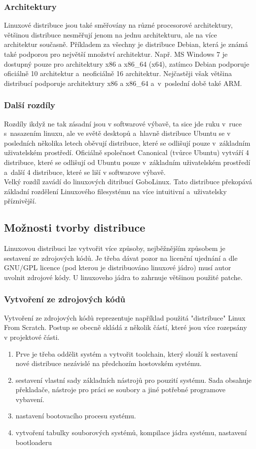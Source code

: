 \documentclass[a4paper,12pt]{article}
\begin{document}
\subsubsection{Architektury}
Linuxové distribuce jsou také směřovány na různé procesorové architektury, většinou distribuce nesměřují jenom na jednu architekturu, ale na více architektur současně. Příkladem za všechny je distribuce Debian, která je známá také podporou pro největší množství architektur. Např. MS Windows 7 je dostupný pouze pro architektury x86 a x86\_64 (x64), zatímco Debian podporuje oficiálně 10 architektur a~neoficiálně 16 architektur. Nejčastěji však většina distribucí podporuje architektury x86 a x86\_64 a~v~poslední době také ARM.

\subsubsection{Další rozdíly}
Rozdíly ikdyž ne tak zásadní jsou v softwarové výbavě, ta sice jde ruku v~ruce s~nasazením linuxu, ale ve světě desktopů a~hlavně distribuce Ubuntu se v posledních několika letech oběvují distribuce, které se odlišují pouze v~základním uživatelském prostředí. Oficiálně  společnost Canonical (tvůrce Ubuntu) vytváří 4 distribuce, které se odlišují od Ubuntu pouze v~základním uživatelském prostředí a~další 4 distribuce, které se liší v softwarove výbavě.
%
%
\\
Velký rozdíl zavádí do linuxových ditribucí GoboLinux. Tato distribuce překopává základní rozdělení Linuxového filesystému na více intuitivní a~uživatelsky příznivější.
%
%

\subsection{Možnosti tvorby distribuce}
Linuxovou distribuci lze vytvořit více způsoby, nejběžnějším způsobem je sestavení ze zdrojových kódů. Je třeba dávat pozor na licenční ujednání a dle GNU/GPL licence (pod kterou je distribuováno linuxové jádro) musí autor uvolnit zdrojové kódy. U linuxoveho jádra to zahrnuje většinou použité patche.
\subsubsection{Vytvoření ze zdrojových kódů}
Vytvoření ze zdrojových kódů reprezentuje například použitá "distribuce" Linux From Scratch. Postup se obecně skládá z několik částí, které jsou více rozepsány v projektové části. %
\begin{enumerate}
 \item Prve je třeba oddělit systém a vytvořit toolchain, který slouží k sestavení nové distribuce nezávislé na předchozím hostovském systému.
\item sestavení vlastní sady základních nástrojů pro pouzití systému. Sada obsahuje překladače, nástroje pro práci se soubory a jiné potřebné programove vybavení.
\item nastavení bootovacího procesu systému.
\item vytvoření tabulky souborových systémů, kompilace jádra systému, nastavení bootloaderu
\end{enumerate}
\end{document}
